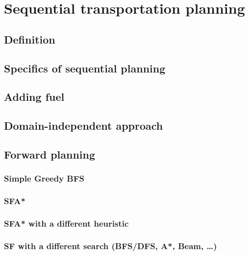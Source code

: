 \chapter{Sequential transportation planning}

\section{Definition}

\section{Specifics of sequential planning}

\section{Adding fuel}

\section{Domain-independent approach}


\section{Forward planning}


\subsection{Simple Greedy BFS}

 \citep{Zhou2015}

\subsection{SFA*}

\subsection{SFA* with a different heuristic}

\subsection{SF with a different search (BFS/DFS, A*, Beam, \ldots)}

